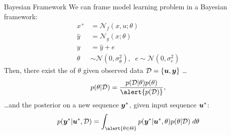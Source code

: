 \documentclass{beamer}
\begin{document}
% 



\begin{frame}{Bayesian Framework}{}
We can frame model learning problem in a Bayesian framework:
\begin{align*}
    x^+ &=  \mathcal{N}_f(x, u; \theta)\\
    \hat y   &= \mathcal{N}_g(x; \theta)\\
    y &= \hat y + e\\
    \theta &\sim \mathcal{N}\left(0, \sigma^2_\theta\right),\;\; e \sim \mathcal{N}\left(0, \sigma^2_e\right)
\end{align*}
\pause
Then, there exist the  of $\theta$ given observed data $\mathcal{D} = \{\bm{u}, \bm{y} \}$ \dots
\begin{equation*}
 p(\theta | \mathcal{D}) = \frac{p(\mathcal{D}|\theta) p(\theta)}{\alert{p(\mathcal{D})}},
\end{equation*}
\pause
\dots and the posterior on a new sequence $\bm{y}^*$, given input sequence $\bm{u}^*$:
\begin{equation*}
 p(\tvec{y}^* | \tvec{u}^*, \mathcal{D}) = \int_{\alert{\theta \in \Theta}} p(\tvec{y}^* | \tvec{u}^*, \theta) p(\theta | \mathcal{D})\; d\theta
\end{equation*}
\end{frame}
\end{document}
